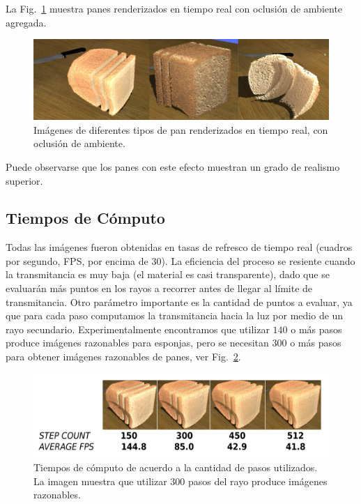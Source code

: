 La Fig.~\ref{fg:breads} muestra panes renderizados en tiempo real con oclusión de ambiente agregada.

\begin{figure}[htb!]
  \centerline{\includegraphics[width=13cm]{breads}}
  \caption{Imágenes de diferentes tipos de pan renderizados en tiempo real, con oclusión de ambiente.}
  \label{fg:breads}
\end{figure}

Puede observarse que los panes con este efecto muestran un grado de realismo superior.

\subsection*{Tiempos de Cómputo}

Todas las imágenes fueron obtenidas en tasas de refresco de tiempo real (cuadros por segundo, FPS, por encima de $30$).
La eficiencia del proceso se resiente cuando la transmitancia es muy baja (el material es casi transparente), dado que se evaluarán más puntos en los rayos a recorrer antes de llegar al límite de transmitancia.
Otro parámetro importante es la cantidad de puntos a evaluar, ya que para cada paso computamos la transmitancia hacia la luz por medio de un rayo secundario.
Experimentalmente encontramos que utilizar $140$ o más pasos produce imágenes razonables para esponjas, pero se necesitan $300$ o más pasos para obtener imágenes razonables de panes, ver Fig.~\ref{fg:stepcount}.


\begin{figure}
  \centerline{\includegraphics[width=13cm]{figures/stepcount}}
  \caption[Tiempos de cómputo de acuerdo a la cantidad de pasos utilizados]{Tiempos de cómputo de acuerdo a la cantidad de pasos utilizados. La imagen muestra que utilizar $300$ pasos del rayo produce imágenes razonables.}
  \label{fg:stepcount}
\end{figure}


